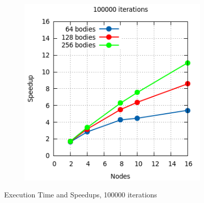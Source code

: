 \documentclass[a4paper]{article}
\begin{document}
\begin{figure}[ht]
\begin{subfigure}{.5\textwidth}
\end{subfigure} %
\begin{subfigure}{.4\textwidth}
  \centering
  \includegraphics[width=1\linewidth]{results/graph5_sp}
\end{subfigure}
  \caption{Execution Time and Speedups, 100000 iterations}
  \label{fig:R1}
\end{figure}
\FloatBarrier

\enspace
\end{document}
